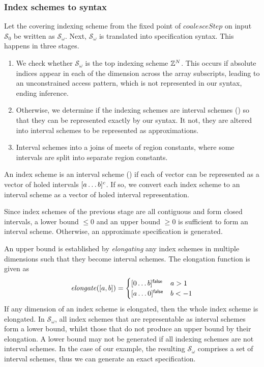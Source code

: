 \subsubsection{Index schemes to syntax}

\newcommand{\finalSet}{\mathcal{S}_\omega}
Let the covering indexing scheme from the fixed point of
$\mathit{coalesceStep}$ on input $\mathcal{S}_0$ be written as
$\finalSet{}$.  Next, $\finalSet{}$ is translated into specification
syntax. This happens in three stages.
%
\begin{enumerate}[leftmargin=2em]
  \item We check whether $\finalSet{}$
  is the top indexing scheme $\textnormal{$\mathbb{Z}$}{}^N$. This occurs if absolute indices
  appear in each of the dimension across the array subscripts,
  leading to an unconstrained access pattern, which is not represented
  in our syntax, ending inference.

  \item Otherwise, we determine if the indexing schemes are interval
  schemes () so that they can be represented
  exactly by our syntax. It not, they are altered into interval
  schemes to be represented as approximations.

  \item Interval schemes into a joins of meets
  of region constants, where some intervals are split into separate
  region constants.
\end{enumerate}
%
An index scheme is an interval scheme () if
each of vector can be represented as a vector of holed intervals
$\textnormal{$\lbrack a\dots b\rbrack^{c}$}$.  If so, we convert each index scheme to an
interval scheme as a vector of holed interval representation.

Since index schemes of the previous stage are all contiguous and form
closed intervals, a lower bound $\leq 0$ and an upper bound $\geq 0$
is sufficient to form an interval scheme.  Otherwise, an approximate
specification is generated.

An upper bound is established by
\emph{elongating} any index schemes in multiple dimensions such that
they become interval schemes. The elongation function is
given as
%
\begin{align*}
  \mathit{elongate}([a,b]) = \begin{cases}
    \textnormal{$\lbrack0\dots b\rbrack^{\textsf{false}}$} & a > 1 \\
    \textnormal{$\lbrack a\dots0\rbrack^{\textsf{false}}$} & b < -1
  \end{cases}
\end{align*}
%
If any dimension of an index scheme is elongated, then the whole index
scheme is elongated. In $\finalSet$, all index schemes that are
representable as interval schemes form a lower bound, whilst those
that do not produce an upper bound by their elongation. A lower bound
may not be generated if all indexing schemes are not interval schemes.
In the case of our example, the resulting $\finalSet$ comprises a set
of interval schemes, thus we can generate an exact specification.


